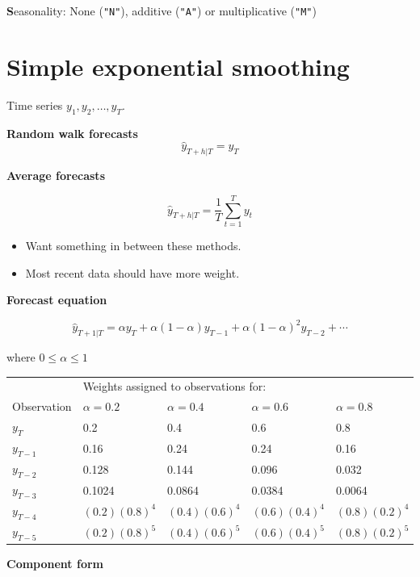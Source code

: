 \documentclass[]{book}
\providecommand{\tightlist}{%
  \setlength{\itemsep}{0pt}\setlength{\parskip}{0pt}}
\begin{document}
\textbf{S}easonality: None (\texttt{"N"}), additive (\texttt{"A"}) or multiplicative (\texttt{"M"})

\hypertarget{simple-exponential-smoothing}{%
\section{Simple exponential smoothing}\label{simple-exponential-smoothing}}

Time series \(y_1,y_2,\dots,y_T\).

\textbf{Random walk forecasts}
\[\hat{y}_{T+h|T} = y_T\]

\textbf{Average forecasts}

\[\hat{y}_{T+h|T} = \frac1T\sum_{t=1}^T y_t\]

\begin{itemize}
\tightlist
\item
  Want something in between these methods.
\item
  Most recent data should have more weight.
\end{itemize}

\textbf{Forecast equation}

\[\hat{y}_{T+1|T} = \alpha y_T + \alpha(1-\alpha) y_{T-1} + \alpha(1-\alpha)^2 y_{T-2}+ \cdots\]

where \(0 \le \alpha \le1\)

\small

\begin{tabular}{lllll}
\toprule
& \multicolumn{4}{l}{Weights assigned to observations for:}\\
Observation  &   $\alpha = 0.2$   &   $\alpha = 0.4$  &   $\alpha = 0.6$  & $\alpha = 0.8$ \\
\midrule
$y_{T}$      & 0.2         & 0.4          & 0.6         & 0.8\\
$y_{T-1}$    & 0.16        & 0.24         & 0.24        & 0.16\\
$y_{T-2}$    & 0.128       & 0.144        & 0.096       & 0.032\\
$y_{T-3}$    & 0.1024      & 0.0864       & 0.0384      & 0.0064\\
$y_{T-4}$    & $(0.2)(0.8)^4$  & $(0.4)(0.6)^4$   & $(0.6)(0.4)^4$  & $(0.8)(0.2)^4$\\
$y_{T-5}$    & $(0.2)(0.8)^5$  & $(0.4)(0.6)^5$   & $(0.6)(0.4)^5$  & $(0.8)(0.2)^5$\\
\bottomrule
\end{tabular}

\textbf{Component form}
\end{document}
